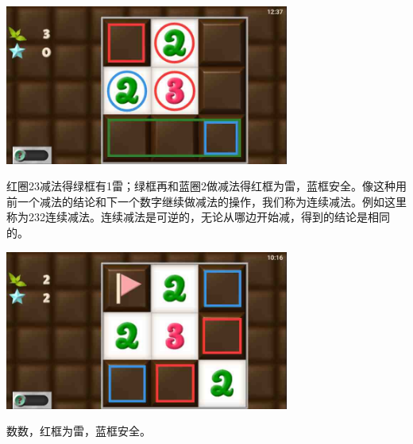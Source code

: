 \subsection{} %
\begin{center}
    \includegraphics[width=0.7\textwidth]{puzzlelow/17-1.jpg}
\end{center}
红圈23减法得绿框有1雷；绿框再和蓝圈2做减法得红框为雷，蓝框安全。像这种用前一个减法的结论和下一个数字继续做减法的操作，我们称为连续减法。例如这里称为232连续减法。连续减法是可逆的，无论从哪边开始减，得到的结论是相同的。
\begin{center}
    \includegraphics[width=0.7\textwidth]{puzzlelow/17-2.jpg}
\end{center}
数数，红框为雷，蓝框安全。

